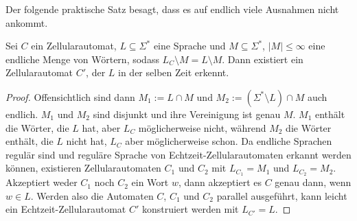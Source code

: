 Der folgende praktische Satz besagt, dass es auf endlich viele Ausnahmen nicht ankommt.
\begin{satz}
    \label{endlichVieleAusnahmen}
    Sei $C$ ein Zellularautomat,
    $L \subseteq \Sigma^*$ eine Sprache und $M \subseteq \Sigma^*$, $|M| \leq \infty$  eine endliche Menge von Wörtern, sodass $L_C \setminus M = L \setminus M$.
    Dann existiert ein Zellularautomat $C'$, der $L$ in der selben Zeit erkennt.
\end{satz}
\begin{proof}
    Offensichtlich sind dann $M_1 := L \cap M$ und $M_2 := (\Sigma^* \setminus L) \cap M$ auch endlich.
    $M_1$ und $M_2$ sind disjunkt und ihre Vereinigung ist genau $M$.
    $M_1$ enthält die Wörter, die $L$ hat, aber $L_C$ möglicherweise nicht, während $M_2$ die Wörter enthält, die $L$ nicht hat, $L_C$ aber möglicherweise schon.
    Da endliche Sprachen regulär sind und reguläre Sprache von Echtzeit-Zellularautomaten erkannt werden können,
    existieren Zellularautomaten $C_1$ und $C_2$ mit $L_{C_1} = M_1$ und $L_{C_2} = M_2$.
    Akzeptiert weder $C_1$ noch $C_2$ ein Wort $w$, dann akzeptiert es $C$ genau dann, wenn $w \in L$.
    Werden also die Automaten $C$, $C_1$ und $C_2$ parallel ausgeführt, kann leicht ein Echtzeit-Zellularautomat $C'$ konstruiert werden mit $L_{C'} = L$.
\end{proof}